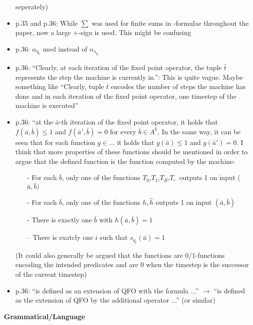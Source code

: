 \begin{itemize}
seperately)
\item p.35 and p.36: While $\sum$ was used for finite sums in \qso-formulae throughout the paper, now
a large +-sign is used. This might be confusing
\item p.36: $\alpha_{q_i}$ used instead of $\alpha_{s_{q_{i}}}$
\item p.36: ``Clearly, at each iteration of the fixed point operator, the tuple $\bar{t}$ represents the step the
machine is currently in.'': This is quite vague. Maybe something like ``Clearly, tuple $\bar{t}$ encodes
the number of steps the machine has done and in each iteration of the fixed point operator,
one timestep of the machine is executed''
\item p.36: ``at the $\bar{a}$-th iteration of the fixed point operator, it holds that $f(\bar{a}, \bar{b}) \leq 1$ and $f(\bar{a}', \bar{b}) = 0$ for every $\bar{b} \in A^k$. 
In the same way, it can be seen that for each function $g \in \ldots$ it holds that $g(\bar{a}) \leq 1$ and $g(\bar{a}')= 0$. 
I think that more properties of these functions should be mentioned
in order to argue that the defined function is the function computed by the machine:
\begin{itemize}
\item[-] For each $\bar{b}$, only one of the functions $T_0$,$T_1$,$T_B$,$T_{\vdash}$ outputs 1 on input ($\bar{a}, \bar{b})$
\item[-] For each $\bar{b}$, only one of the functions $h,\hat{h}$ outputs 1 on input $(\bar{a}, \bar{b})$
\item[-] There is exactly one $\bar{b}$ with $h(\bar{a}, \bar{b}) = 1$
\item[–] There is exatcly one $i$ such that $s_{q_i}(\bar{a}) = 1$
\end{itemize}
(It could also generally be argued that the functions are 0/1-functions encoding the intended
predicates and are 0 when the timestep is the successor of the current timestep)
\item p.36: ``is defined as an extension of QFO with the formula ...'' $\to$	 ``is defined as the extension
of QFO by the additional operator ...'' (or similar)
\end{itemize}
\vspace{1em}
{\bf Grammatical/Language}
